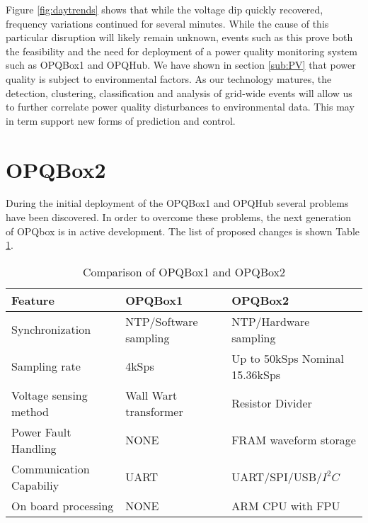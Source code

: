 Figure \ref{fig:daytrends} shows that while the voltage dip quickly recovered, frequency variations continued for several minutes. While the cause of this particular disruption will likely remain unknown, events such as this prove both the feasibility and the need for deployment of a power quality monitoring system such as OPQBox1 and OPQHub. We have shown in section \ref{sub:PV} that power quality is subject to environmental factors. As our technology matures, the detection, clustering, classification and analysis of grid-wide events will allow us to further correlate power quality disturbances to environmental data. This may in term support new forms of prediction and control.


\section{OPQBox2}\label{chap:further}

During the initial deployment of the OPQBox1 and OPQHub several problems have been discovered. In order to overcome these problems, the next generation of OPQbox is in active development.
The list of proposed  changes is shown Table \ref{tbl:comp}. 

\begin{table}[h!]
\caption{Comparison of OPQBox1 and OPQBox2}
\label{tbl:comp}
\begin{tabular}{|l|l|l|}
\hline
\textbf{Feature}        & \textbf{OPQBox1}               & \textbf{OPQBox2}                     \\ \hline
Synchronization         & NTP/Software sampling    & NTP/Hardware sampling         				 	\\ \hline
Sampling rate           & 4kSps                 & Up to 50kSps Nominal 15.36kSps 					\\ \hline
Voltage sensing method  & Wall Wart transformer & Resistor Divider            					\\ \hline
Power Fault Handling    & NONE                  & FRAM waveform storage       					\\ \hline
Communication Capabiliy & UART                  & UART/SPI/USB/$I^2C$               					\\ \hline
On board processing     & NONE					& ARM CPU with FPU								\\ \hline
\end{tabular}
\end{table}


